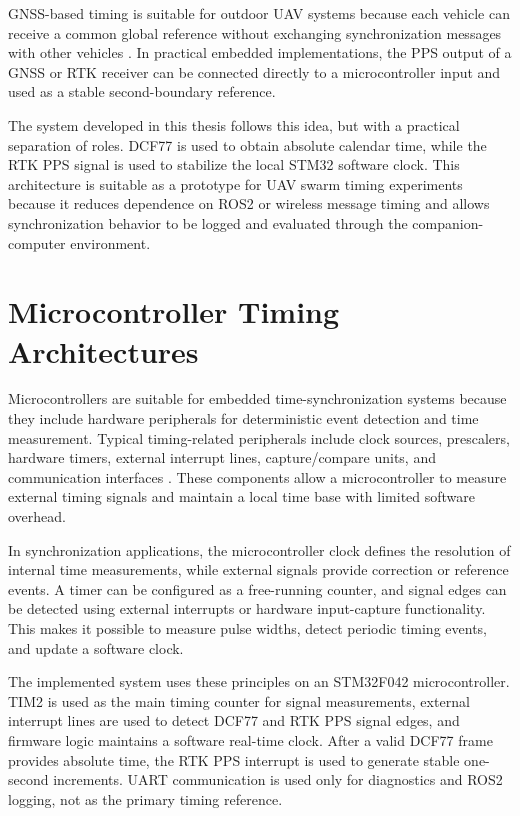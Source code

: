 GNSS-based timing is suitable for outdoor UAV systems because each vehicle can receive a common global reference without exchanging synchronization messages with other vehicles \cite{teunissen2017springer}. In practical embedded implementations, the PPS output of a GNSS or RTK receiver can be connected directly to a microcontroller input and used as a stable second-boundary reference.

The system developed in this thesis follows this idea, but with a practical separation of roles. DCF77 is used to obtain absolute calendar time, while the RTK PPS signal is used to stabilize the local STM32 software clock. This architecture is suitable as a prototype for UAV swarm timing experiments because it reduces dependence on ROS2 or wireless message timing and allows synchronization behavior to be logged and evaluated through the companion-computer environment.

\section{Microcontroller Timing Architectures}

Microcontrollers are suitable for embedded time-synchronization systems because they include hardware peripherals for deterministic event detection and time measurement. Typical timing-related peripherals include clock sources, prescalers, hardware timers, external interrupt lines, capture/compare units, and communication interfaces \cite{kopetz2011realtime}. These components allow a microcontroller to measure external timing signals and maintain a local time base with limited software overhead.

In synchronization applications, the microcontroller clock defines the resolution of internal time measurements, while external signals provide correction or reference events. A timer can be configured as a free-running counter, and signal edges can be detected using external interrupts or hardware input-capture functionality. This makes it possible to measure pulse widths, detect periodic timing events, and update a software clock.

The implemented system uses these principles on an STM32F042 microcontroller. TIM2 is used as the main timing counter for signal measurements, external interrupt lines are used to detect DCF77 and RTK PPS signal edges, and firmware logic maintains a software real-time clock. After a valid DCF77 frame provides absolute time, the RTK PPS interrupt is used to generate stable one-second increments. UART communication is used only for diagnostics and ROS2 logging, not as the primary timing reference.

